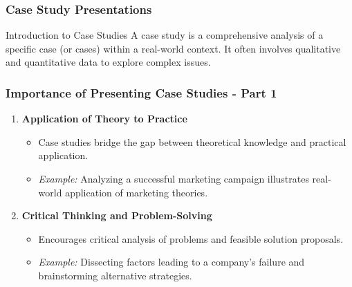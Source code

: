 \documentclass{beamer}
\begin{document}
\begin{frame}[fragile]
    \frametitle{Case Study Presentations}
    \begin{block}{Introduction to Case Studies}
        A case study is a comprehensive analysis of a specific case (or cases) within a real-world context. 
        It often involves qualitative and quantitative data to explore complex issues.
    \end{block}
\end{frame}

\begin{frame}[fragile]
    \frametitle{Importance of Presenting Case Studies - Part 1}
    \begin{enumerate}
        \item \textbf{Application of Theory to Practice} 
        \begin{itemize}
            \item Case studies bridge the gap between theoretical knowledge and practical application.
            \item \textit{Example:} Analyzing a successful marketing campaign illustrates real-world application of marketing theories.
        \end{itemize}
        
        \item \textbf{Critical Thinking and Problem-Solving}
        \begin{itemize}
            \item Encourages critical analysis of problems and feasible solution proposals.
            \item \textit{Example:} Dissecting factors leading to a company's failure and brainstorming alternative strategies.
        \end{itemize}
    \end{enumerate}
\end{frame}
\end{document}
